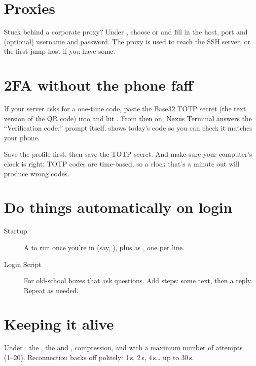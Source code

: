 \section{Proxies}

Stuck behind a corporate proxy? Under , choose  or  and fill in the host,
port and (optional) username and password. The proxy is used to reach the SSH server, or the first jump host if
you have some.

\section{2FA without the phone faff}\label{sec:totp}

If your server asks for a one-time code, paste the Base32 TOTP secret (the text version of the QR code) into
 and hit . From then on, Nexus Terminal answers the ``Verification code:'' prompt itself.
 shows today's code so you can check it matches your phone.

\begin{headsup}
Save the profile first, then save the TOTP secret. And make sure your computer's clock is right: TOTP codes are
time-based, so a clock that's a minute out will produce wrong codes.
\end{headsup}

\section{Do things automatically on login}

\begin{description}
  \item[Startup] A  to run once you're in (say, ), plus
         as , one per line.
  \item[Login Script] For old-school boxes that ask questions. Add steps:  some text, then
         a reply. Repeat as needed.
\end{description}

\section{Keeping it alive}

Under : the , the  and , compression,
and  with a maximum number of attempts (1–20). Reconnection backs off politely: 1\,s, 2\,s,
4\,s… up to 30\,s.


